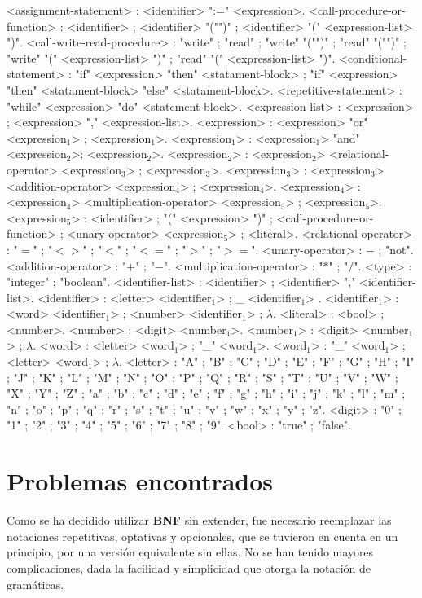\begin{grammar}
		<assignment-statement> : <identifier> ":=" <expression>.
		<call-procedure-or-function> : <identifier> ; <identifier> "("")" ; <identifier> "(" <expression-list> ")".
        <call-write-read-procedure> : "write" ; "read" ; "write" "("")" ; "read" "("")" ; "write" "(" <expression-list> ")" ; "read" "(" <expression-list> ")". 
		<conditional-statement> : "if" <expression> "then" <statament-block> ; "if" <expression> "then" <statament-block> "else" <statament-block>.
		<repetitive-statement> : "while" <expression> "do" <statement-block>.
		<expression-list> : <expression> ; <expression> "," <expression-list>.
        <expression> :  <expression> "or" <expression$_{1}$> ; <expression$_{1}$>. 
		<expression$_{1}$> :  <expression$_{1}$> "and" <expression$_{2}$>; <expression$_{2}$>.
		<expression$_{2}$> : <expression$_{2}$> <relational-operator> <expression$_{3}$> ; <expression$_{3}$>.
		<expression$_{3}$> : <expression$_{3}$> <addition-operator> <expression$_{4}$> ;  <expression$_{4}$>.
		<expression$_{4}$> : <expression$_{4}$> <multiplication-operator> <expression$_{5}$> ;  <expression$_{5}$>.
		<expression$_{5}$> : <identifier> ; "(" <expression> ")" ; <call-procedure-or-function> ; <unary-operator> <expression$_{5}$> ; <literal>.
		<relational-operator> : "$=$" ; "$<>$" ; "$<$" ; "$<=$" ; "$>$" ; "$>=$".
        <unary-operator> : $-$ ; "not".
		<addition-operator> : "$+$" ; "$-$".
		<multiplication-operator> : "$*$" ; "$/$".
		<type> : "integer" ; "boolean".
		<identifier-list> : <identifier> ; <identifier> "," <identifier-list>.
		<identifier> : <letter> <identifier$_1$> ; \_ <identifier$_1$> .
        <identifier$_1$> : <word> <identifier$_1$> ; <number> <identifier$_1$> ; $\lambda$.
		<literal> : <bool> ; <number>.
		<number> :  <digit> <number$_1$>.
		<number$_1$> : <digit> <number$_1$> ; $\lambda$.
        <word> : <letter> <word$_1$> ; "\_" <word$_1$>.
		<word$_1$> : "\_" <word$_1$> ; <letter> <word$_1$> ; $\lambda$.
		<letter> : "A" ; "B" ; "C" ; "D" ; "E" ; "F" ; "G" ; "H" ; "I" ; "J" ; "K" ; "L" ; "M" ; "N" ; "O" ; "P" ; "Q" ; "R" ; "S" ; "T" ; "U" ; "V" ; "W" ; "X" ; "Y" ; "Z" ; "a" ; "b" ; "c" ; "d" ; "e" ; "f" ; "g" ; "h" ; "i" ; "j" ; "k" ; "l" ; "m" ; "n" ; "o" ; "p" ; "q" ; "r" ; "s" ; "t" ; "u" ; "v" ; "w" ; "x" ; "y" ; "z".
		<digit> : "0" ; "1" ; "2" ; "3" ; "4" ; "5" ; "6" ; "7" ; "8" ; "9".
		<bool> : "true" ; "false".
\end{grammar}

\section{Problemas encontrados}
Como se ha decidido utilizar \textbf{BNF} sin extender, fue necesario reemplazar las notaciones repetitivas, optativas y opcionales, que se tuvieron en cuenta en un principio, por una versión equivalente sin ellas. No se han tenido mayores complicaciones, dada la facilidad y simplicidad que otorga la notación de gramáticas.

